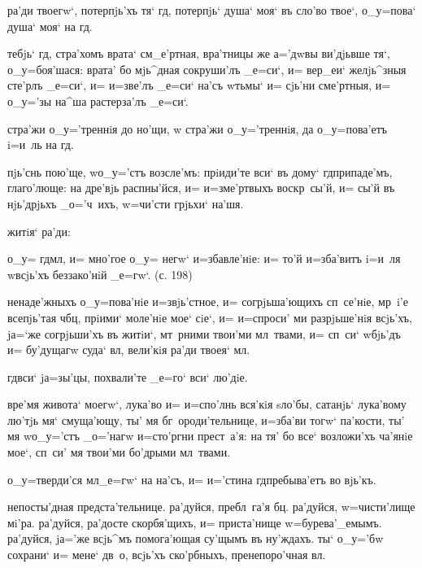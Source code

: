   ра'ди твоегw`, потерпjь'хъ тя` 
гд, потерпjь` душа` моя` въ сло'во твое`, о_у=пова` 
душа` моя` на гд.

 тебjь` гд, стра'хомъ врата` 
см_е'ртная, вра'тницы же а='дwвы ви'дjьвше тя`, 
о_у=боя'шася: врата' бо мjь^дная сокруши'лъ _е=си`, и= 
вер_еи` желjь^зныя сте'рлъ _е=си`, и= и=зве'лъ _е=си` 
на'съ w\т тьмы` и= сjь'ни сме'ртныя, и= о_у='зы на^ша 
растерза'лъ _е=си`.

 стра'жи о_у='треннiя до но'щи, w\т 
стра'жи о_у='треннiя, да о_у=пова'етъ i=и~ль на гд.

 пjь'снь пою'ще, w\т о_у='стъ 
возсле'мъ: прiиди'те вси` въ дому` гд припаде'мъ, 
глаго'люще: на дре'вjь распны'йся, и= и=з\ъ ме'ртвыхъ 
воскр~сы'й, и= сы'й въ нjь'дрjьхъ _о='ч~ихъ, w=чи'сти 
грjьхи` на'шя.


  житiя` ра'ди:

  о_у= гд мл, и= мно'гое о_у= 
негw` и=збавле'нiе: и= то'й и=зба'витъ i=и~ля w\т всjь'хъ 
беззако'нiй _е=гw`. (с. 198)

 ненаде'жныхъ о_у=пова'нiе и=звjь'стное, и= 
согрjьша'ющихъ сп~се'нiе, мр~i'е всепjь'тая ч бц, 
прiими` моле'нiе мое` сiе`, и= и=спроси' ми разрjьше'нiя 
всjь'хъ, jа=`же согрjьши'хъ въ житiи`, мт~рними твои'ми 
мл~твами, и= сп~си` w\т бjь'дъ и= бу'дущагw суда` 
вл, вели'кiя ра'ди твоея` мл.

  гд вси` jа=зы'цы, похвали'те 
_е=го` вси` лю'дiе.

 вре'мя живота` моегw`, лука'во и= 
и=спо'лнь вся'кiя sло'бы, сатанjь` лука'вому лю'тjь мя` 
смуща'ющу, ты' мя бг~ороди'тельнице, и=зба'ви тогw` 
па'кости, ты' мя w\т о_у='стъ _о='нагw и=сто'ргни 
прест~а'я: на тя' бо все` возложи'хъ ча'янiе мое`, сп~си' 
мя твои'ми бо'дрыми мл~твами.

  о_у=тверди'ся мл _е=гw` на 
на'съ, и= и='стина гд пребыва'етъ во вjь'къ.

 непосты'дная предста'тельнице. ра'дуйся, 
пребл~га'я бц. ра'дуйся, w=чисти'лище мi'ра. ра'дуйся, 
ра'досте скорбя'щихъ, и= приста'нище w=бурева'_емымъ. 
ра'дуйся, jа='же всjь^мъ помога'ющая су'щымъ въ ну'ждахъ. 
ты` о_у='бw сохрани` и= мене` дв~о, всjь'хъ ско'рбныхъ, 
пренепоро'чная вл.

